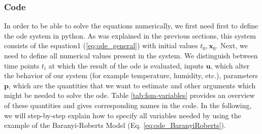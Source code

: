 \documentclass[graybox]{svmult}
\newcommand{\mbx}{\mathbf{x}}
\newcommand{\mbu}{\mathbf{u}}
\newcommand{\mbp}{\mathbf{p}}
\begin{document}
\subsubsection*{Code}
In order to be able to solve the equations numerically, we first need first to define the \ac{ode} system in python.
As was explained in the previous sections, this system consists of the equation1 (\ref{eq:ode_general}) with initial values $t_0, \mbx_0$.
Next, we need to define all numerical values present in the system.
We distinguish between time points $t_i$ at which the result of the \ac{ode} is evaluated, inputs $\mbu$, which alter the behavior of our system (for example temperature, humidity, etc.), parameters $\mbp$, which are the quantities that we want to estimate and other arguments which might be needed to solve the \ac{ode}.
Table \ref{tab:fsm-variables} provides an overview of these quantities and gives corresponding names in the code.
In the following, we will step-by-step explain how to specify all variables needed by using the example of the Baranyi-Roberts Model (Eq. \ref{eq:ode_BaranyiRoberts}).
\end{document}
